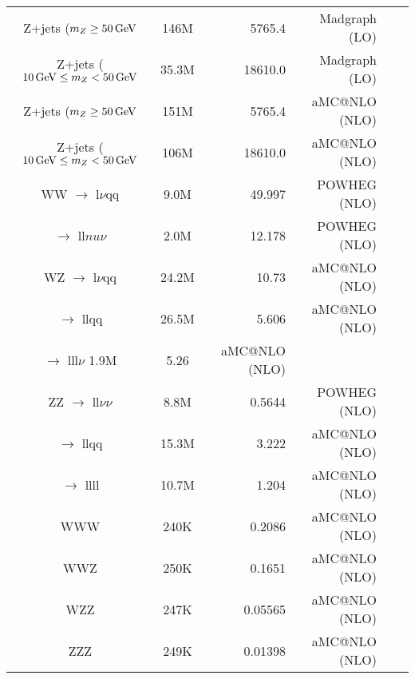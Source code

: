 \begin{table}[htbp]
{\begin{tabular}{ccr@{\hspace{4ex}}r@{\hspace{4ex}}r@{\hspace{4ex}}r@{\hspace{4ex}}}
   Z+jets ($m_{Z} \geq 50\,\text{Ge\hspace{-.08em}V} $ & 146M & 5765.4 & Madgraph (LO) \\
   Z+jets ($10 \,\text{Ge\hspace{-.08em}V} \leq m_{Z} < 50\,\text{Ge\hspace{-.08em}V}$ & 35.3M & 18610.0 & Madgraph (LO) \\
   \hline
   Z+jets ($m_{Z} \geq 50\,\text{Ge\hspace{-.08em}V} $ & 151M & 5765.4 & aMC@NLO (NLO) \\
   Z+jets ($10 \,\text{Ge\hspace{-.08em}V} \leq m_{Z} < 50\,\text{Ge\hspace{-.08em}V}$ & 106M & 18610.0 & aMC@NLO (NLO) \\
   \hline
   WW $\rightarrow$ l$\nu$qq & 9.0M & 49.997  & POWHEG (NLO) \\
      $\rightarrow$ ll$nu\nu$ & 2.0M & 12.178 & POWHEG (NLO) \\
   \hline
   WZ $\rightarrow$ l$\nu$qq & 24.2M & 10.73 & aMC@NLO (NLO) \\
      $\rightarrow$ llqq & 26.5M & 5.606 & aMC@NLO (NLO) \\
      $\rightarrow$ lll$\nu$ 1.9M & 5.26 & aMC@NLO (NLO) \\
   \hline
   ZZ $\rightarrow$ ll$\nu\nu$ & 8.8M & 0.5644 & POWHEG (NLO) \\
      $\rightarrow$ llqq & 15.3M & 3.222 & aMC@NLO (NLO) \\
      $\rightarrow$ llll & 10.7M & 1.204 & aMC@NLO (NLO) \\
   \hline
   WWW & 240K & 0.2086 & aMC@NLO (NLO) \\
   \hline
   WWZ & 250K & 0.1651 & aMC@NLO (NLO) \\
   \hline
   WZZ & 247K & 0.05565 & aMC@NLO (NLO) \\
   \hline
   ZZZ & 249K & 0.01398 & aMC@NLO (NLO) \\
   \hline
   
 \end{tabular}}
 \addtolength{\tabcolsep}{-1ex}
\end{table}


